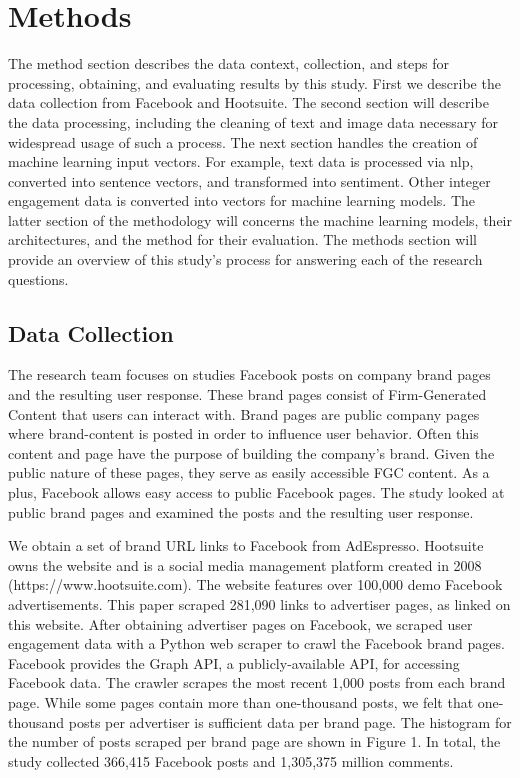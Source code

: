 \documentclass[mksc,blindrev]{informs3} %
\begin{document}
\section{Methods}
The method section describes the data context, collection, and steps for processing, obtaining, and evaluating results by this study. First we describe the data collection from Facebook and Hootsuite. The second section will describe the data processing, including the cleaning of text and image data necessary for widespread usage of such a process. The next section handles the creation of machine learning input vectors. For example, text data is processed via nlp, converted into sentence vectors, and transformed into sentiment. Other integer engagement data is converted into vectors for machine learning models. The latter section of the methodology will concerns the machine learning models, their architectures, and the method for their evaluation. The methods section will provide an overview of this study's process for answering each of the research questions.

\subsection{Data Collection}
The research team focuses on studies Facebook posts on company brand pages and the resulting user response. These brand pages consist of Firm-Generated Content that users can interact with. Brand pages are public company pages where brand-content is posted in order to influence user behavior. Often this content and page have the purpose of building the company's brand. Given the public nature of these pages, they serve as easily accessible FGC content. As a plus, Facebook allows easy access to public Facebook pages. The study looked at public brand pages and examined the posts and the resulting user response.

We obtain a set of brand URL links to Facebook from AdEspresso. Hootsuite owns the website and is a social media management platform created in 2008 (https://www.hootsuite.com). The website features over 100,000 demo Facebook advertisements. This paper scraped 281,090 links to advertiser pages, as linked on this website. After obtaining advertiser pages on Facebook, we scraped user engagement data with a Python web scraper to crawl the Facebook brand pages. Facebook provides the Graph API, a publicly-available API, for accessing Facebook data. The crawler scrapes the most recent 1,000 posts from each brand page. While some pages contain more than one-thousand posts, we felt that one-thousand posts per advertiser is sufficient data per brand page. The histogram for the number of posts scraped per brand page are shown in Figure 1. In total, the study collected 366,415 Facebook posts and 1,305,375 million comments. 
\end{document}
